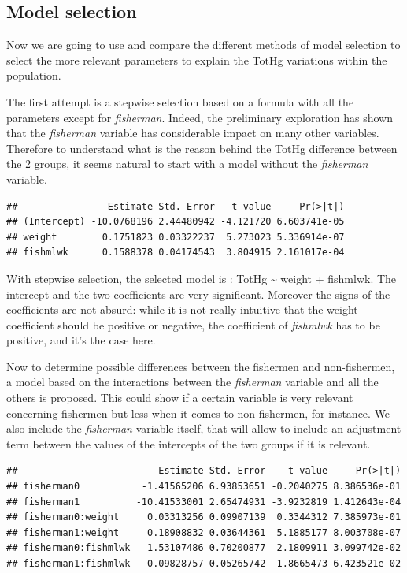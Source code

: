 \documentclass[12pt,]{article}
\begin{document}
\subsection{Model selection}\label{model-selection}

Now we are going to use and compare the different methods of model
selection to select the more relevant parameters to explain the TotHg
variations within the population.

The first attempt is a stepwise selection based on a formula with all
the parameters except for \emph{fisherman}. Indeed, the preliminary
exploration has shown that the \emph{fisherman} variable has
considerable impact on many other variables. Therefore to understand
what is the reason behind the TotHg difference between the 2 groups, it
seems natural to start with a model without the \emph{fisherman}
variable.

\begin{verbatim}
##                Estimate Std. Error   t value     Pr(>|t|)
## (Intercept) -10.0768196 2.44480942 -4.121720 6.603741e-05
## weight        0.1751823 0.03322237  5.273023 5.336914e-07
## fishmlwk      0.1588378 0.04174543  3.804915 2.161017e-04
\end{verbatim}

With stepwise selection, the selected model is : TotHg \textasciitilde{}
weight + fishmlwk. The intercept and the two coefficients are very
significant. Moreover the signs of the coefficients are not absurd:
while it is not really intuitive that the weight coefficient should be
positive or negative, the coefficient of \emph{fishmlwk} has to be
positive, and it's the case here.

Now to determine possible differences between the fishermen and
non-fishermen, a model based on the interactions between the
\emph{fisherman} variable and all the others is proposed. This could
show if a certain variable is very relevant concerning fishermen but
less when it comes to non-fishermen, for instance. We also include the
\emph{fisherman} variable itself, that will allow to include an
adjustment term between the values of the intercepts of the two groups
if it is relevant.

\begin{verbatim}
##                         Estimate Std. Error    t value     Pr(>|t|)
## fisherman0           -1.41565206 6.93853651 -0.2040275 8.386536e-01
## fisherman1          -10.41533001 2.65474931 -3.9232819 1.412643e-04
## fisherman0:weight     0.03313256 0.09907139  0.3344312 7.385973e-01
## fisherman1:weight     0.18908832 0.03644361  5.1885177 8.003708e-07
## fisherman0:fishmlwk   1.53107486 0.70200877  2.1809911 3.099742e-02
## fisherman1:fishmlwk   0.09828757 0.05265742  1.8665473 6.423521e-02
\end{verbatim}
\end{document}
